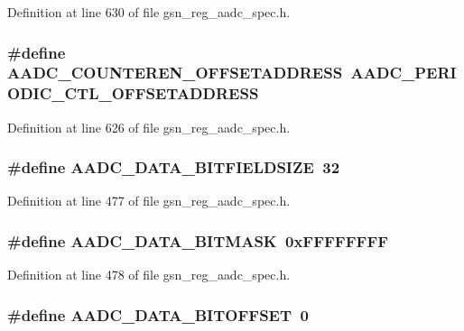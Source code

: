 Definition at line 630 of file gsn\_\-reg\_\-aadc\_\-spec.h.

\hypertarget{a00543_aec59431f33a1735c1bb0adf18a115438}{
\subsubsection[{AADC\_\-COUNTEREN\_\-OFFSETADDRESS}]{\setlength{\rightskip}{0pt plus 5cm}\#define AADC\_\-COUNTEREN\_\-OFFSETADDRESS~AADC\_\-PERIODIC\_\-CTL\_\-OFFSETADDRESS}}
\label{a00543_aec59431f33a1735c1bb0adf18a115438}


Definition at line 626 of file gsn\_\-reg\_\-aadc\_\-spec.h.

\hypertarget{a00543_a30e6864c56131fa5be89835ec3ad3a8f}{
\subsubsection[{AADC\_\-DATA\_\-BITFIELDSIZE}]{\setlength{\rightskip}{0pt plus 5cm}\#define AADC\_\-DATA\_\-BITFIELDSIZE~32}}
\label{a00543_a30e6864c56131fa5be89835ec3ad3a8f}


Definition at line 477 of file gsn\_\-reg\_\-aadc\_\-spec.h.

\hypertarget{a00543_a1758e1ae09e21e588b7f4d5c590ed71d}{
\subsubsection[{AADC\_\-DATA\_\-BITMASK}]{\setlength{\rightskip}{0pt plus 5cm}\#define AADC\_\-DATA\_\-BITMASK~0xFFFFFFFF}}
\label{a00543_a1758e1ae09e21e588b7f4d5c590ed71d}


Definition at line 478 of file gsn\_\-reg\_\-aadc\_\-spec.h.

\hypertarget{a00543_ad019e431ecf1252f53e2e6cb9f56fed3}{
\subsubsection[{AADC\_\-DATA\_\-BITOFFSET}]{\setlength{\rightskip}{0pt plus 5cm}\#define AADC\_\-DATA\_\-BITOFFSET~0}}
\label{a00543_ad019e431ecf1252f53e2e6cb9f56fed3}


